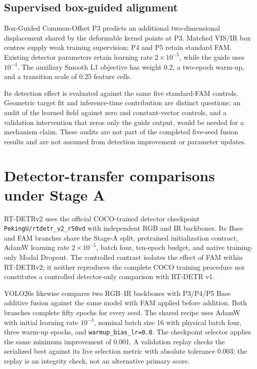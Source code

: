 \subsection{Supervised box-guided alignment}

Box-Guided Common-Offset P3 predicts an additional two-dimensional displacement
shared by the deformable kernel points at P3. Matched VIS/IR box centres supply
weak training supervision; P4 and P5 retain standard FAM. Existing detector
parameters retain learning rate \(2\times10^{-5}\), while the guide uses
\(10^{-4}\). The auxiliary Smooth L1 objective has weight 0.2, a two-epoch
warm-up, and a transition scale of 0.25 feature cells.

Its detection effect is evaluated against the same five standard-FAM controls.
Geometric target fit and inference-time contribution are distinct questions:
an audit of the learned field against zero and constant-vector controls, and
a validation intervention that zeros only the guide output, would be needed
for a mechanism claim. These audits are not part of the completed five-seed
fusion results and are not assumed from detection improvement or parameter
updates.

\section{Detector-transfer comparisons under Stage A}
\label{sec:detector-stage-a-method}

RT-DETRv2 uses the official COCO-trained detector checkpoint
\texttt{PekingU/rtdetr\_v2\_r50vd} with independent RGB and IR backbones. Its
Base and FAM branches share the Stage-A split, pretrained
initialization contract, AdamW learning rate \(2\times10^{-5}\), batch four,
ten-epoch budget, and native training-only Modal Dropout. The controlled
contrast isolates the effect of FAM within RT-DETRv2; it neither reproduces
the complete COCO training procedure nor constitutes a controlled
detector-only comparison with RT-DETR v1.

YOLO26s likewise compares two RGB--IR backbones with P3/P4/P5 Base additive fusion
against the same model with FAM applied before addition. Both branches complete
fifty epochs for every seed. The shared recipe uses AdamW with initial learning
rate \(10^{-3}\), nominal batch size 16 with physical batch four, three warm-up
epochs, and \texttt{warmup\_bias\_lr=0.0}. The checkpoint selector applies the
same minimum improvement of 0.001. A validation replay checks the serialized
best against its live selection metric with absolute tolerance 0.003;
the replay is an integrity check, not an alternative primary score.

